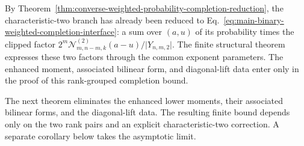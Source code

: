 \documentclass[11pt]{article}
\newcommand{\1}{\mathbf 1}
\theoremstyle{plain}
\theoremstyle{definition}
\theoremstyle{remark}
\begin{document}
By Theorem~\ref{thm:converse-weighted-probability-completion-reduction}, the
characteristic-two branch has already been reduced to
Eq.~\eqref{eq:main-binary-weighted-completion-interface}: a sum over $(a,u)$
of its probability times the clipped factor
$2^m\mathcal N_{m,n-m,k}^{(2)}(a-u)/\lvert Y_{n,m,2}\rvert$.  The finite structural
theorem expresses these two factors through the common exponent parameters.
The enhanced moment, associated bilinear form, and diagonal-lift data enter only in the
proof of this rank-grouped completion bound.

The next theorem eliminates the enhanced lower moments, their associated
bilinear forms, and the diagonal-lift data.  The resulting finite bound depends only on the two rank pairs and an
explicit characteristic-two correction.  A separate corollary below takes
the asymptotic limit.
\end{document}
